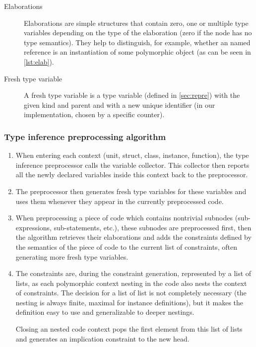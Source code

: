 \begin{description}
    \item[Elaborations] Elaborations are simple structures that contain zero, one or multiple type variables depending on the type of the elaboration (zero if the node has no type semantics). They help to distinguish, for example, whether an named reference is an instantiation of some polymorphic object (as can be seen in \cref{lst:elab}).

    \item[Fresh type variable] A fresh type variable is a type variable (defined in \cref{sec:repre}) with the given kind and parent and with a new unique identifier (in our implementation, chosen by a specific counter).
\end{description}

\subsubsection{Type inference preprocessing algorithm}

\begin{enumerate}
    \item When entering each context (unit, struct, class, instance, function), the type inference preprocessor calls the variable collector. This collector then reports all the newly declared variables inside this context back to the preprocessor.

    \item The preprocessor then generates fresh type variables for these variables and uses them whenever they appear in the currently preprocessed code.

    \item When preprocessing a piece of code which contains nontrivial subnodes (sub-expressions, sub-statements, etc.), these subnodes are preprocessed first, then the algorithm retrieves their elaborations and adds the constraints defined by the semantics of the piece of code to the current list of constraints, often generating more fresh type variables.

    \item The constraints are, during the constraint generation, represented by a list of lists, as each polymorphic context nesting in the code also nests the context of constraints. The decision for a list of list is not completely necessary (the nesting is always finite, maximal for instance definitions), but it makes the definition easy to use and generalizable to deeper nestings.

    Closing an nested code context pops the first element from this list of lists and generates an implication constraint to the new head.
\end{enumerate}

